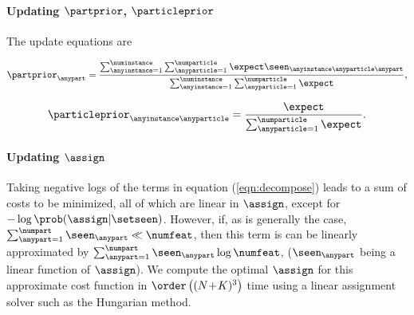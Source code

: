 \paragraph{Updating $\partprior$, $\particleprior$}  The update equations are
\newline
{\centering
\noindent\begin{minipage}{0.45\linewidth}
\begin{equation}
\partprior_{\anypart} = \frac{\sum_{\anyinstance=1}^\numinstance \sum_{\anyparticle = 1}^{\numparticle} \expect\seen_{\anyinstance\anyparticle\anypart}}{\sum_{\anyinstance=1}^\numinstance \sum_{\anyparticle = 1}^{\numparticle} \expect},
\end{equation}
\end{minipage}
\begin{minipage}{0.45\linewidth}
\begin{equation}
\particleprior_{\anyinstance\anyparticle} = 
\frac{\expect}{\sum_{\anyparticle = 1}^{\numparticle} \expect}.
\end{equation}
\end{minipage}
}

\paragraph{Updating $\assign$}
Taking negative logs of the terms in equation (\ref{eqn:decompose}) leads to a sum of costs to be minimized, all of which are linear in $\assign$, except for $-\log\prob(\assign|\setseen)$. However, if, as is generally the case, $\sum_{\anypart=1}^{\numpart}\seen_\anypart \ll \numfeat$, then this term is can be linearly approximated by $\sum_{\anypart=1}^{\numpart}\seen_\anypart\log\numfeat$, ($\seen_\anypart$ being a linear function of $\assign$). We compute the optimal $\assign$ for this approximate cost function in $\order\left((N\!+\!K)^3\right)$ time using a linear assignment solver such as the Hungarian method.

